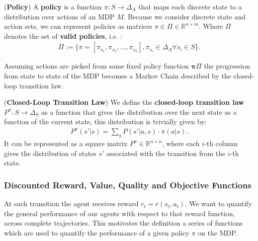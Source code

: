 \begin{definition}
    (\textbf{Policy})
    A \textbf{policy} is a function $\pi:S \rightarrow \Delta_A$ that maps each discrete state to a distribution over actions of an MDP $\textit{M}$. Because we consider discrete state and action sets, we can represent policies as matrices $\pi\in \Pi \in \mathbb{R}^{n \times m}$. Where $\Pi$ denotes the set of \textbf{valid policies}, i.e. : 
    \begin{align*}
        \Pi := \Big\{ \pi = [\pi_{s_1},\pi_{s_2},...,\pi_{s_n}], \pi_{s_i}\in \Delta_A \forall s_i \in S \Big\} .
    \end{align*}
\end{definition}
\noindent
Assuming actions are picked from some fixed policy function $\bm{\pi}\Pi$ the progression from state to state of the MDP becomes a Markov Chain described by the closed-loop transition law.

\begin{definition}
    (\textbf{Closed-Loop Transition Law})
    We define the \textbf{closed-loop transition law} $P^\pi :S \rightarrow \Delta_S$ as a function that gives the distribution over the next state as a function of the current state, this distribution is trivially given by: 
    \begin{align*}
        P^\pi(s'|s) = \sum_a P(s'|a,s) \cdot \pi(a|s).
    \end{align*}
    \noindent
    It can be represented as a square matrix $P^\pi \in \mathbb{R}^{n \times n}$, where each $i$-th column gives the distribution of states $s'$ associated with the transition from the $i$-th state.
\end{definition}

\subsubsection{Discounted Reward, Value, Quality and Objective Functions}

At each transition the agent receives reward $r_t = r(s_t,a_t)$. We want to quantify the general performance of our agents with respect to that reward function, across complete trajectories. This motivates the definition a series of functions which are used to quantify the performance of a given policy $\pi$ on the MDP. 

